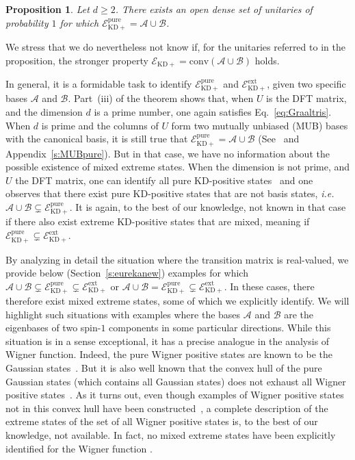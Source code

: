\documentclass[a4paper, notitlepage, 11pt]{article}
\numberwithin{equation}{section}
\newcommand{\Acal}{{\mathcal A}}
\newcommand{\Bcal}{{\mathcal B}}
\newcommand{\EcalKDC}{{\mathcal E}_{\mathrm{KD+}}}
\newcommand{\EcalKDCpu}{{\mathcal E}_{\mathrm{KD+}}^{\mathrm{pure}}}
\newcommand{\EcalKDCext}{{\mathcal E}_{\mathrm{KD+}}^{\mathrm{ext}}}
\newcommand{\conv}[1]{\mathrm{conv}\left(#1\right)}
\newcommand{\convAB}{\conv{\Acal \cup \Bcal}}
\newtheorem{Prop}[Theorem]{Proposition}
\begin{document}
\begin{Prop}\label{prop:pure_char} Let $d\geq2$.
There exists an open dense set of unitaries of probability $1$ for which $\EcalKDCpu=\Acal\cup\Bcal$.
\end{Prop} 
 We stress that we do nevertheless not know if, for the unitaries referred to in the proposition, the stronger property $\EcalKDC=\convAB$ holds.

In general, it is a formidable task to identify  $\EcalKDCpu$ and $\EcalKDCext$, given two specific bases $\Acal$ and $\Bcal$. Part~(iii) of the theorem shows that, when $U$ is the DFT matrix, and the dimension $d$ is a prime number, one again {satisfies} Eq.~\eqref{eq:Graaltris}. 
When $d$ is prime and { the columns of $U$ form two}  {mutually unbiased} (MUB) {bases with the canonical basis},  it is still true that $\EcalKDCpu=\Acal\cup\Bcal$ (See~\cite{Xu22} and Appendix~\ref{s:MUBpure}). But in that case, we have no information about the possible existence of mixed extreme states. 
When the dimension is not prime, and $U$ the DFT matrix, one can identify all pure KD-positive states~\cite{debievre2021,Xu22, debievre2023a} and one observes that there exist pure KD-positive states that are not basis states, \emph{i.e.} $\Acal\cup\Bcal\subsetneq \EcalKDCpu$. It is again, to the best of our knowledge, not known in that case if there also exist extreme KD-positive states that are mixed, meaning if $\EcalKDCpu\subsetneq \EcalKDCext$. 


By analyzing in detail the situation where the transition matrix is real-valued, we  provide below (Section~\ref{s:eurekanew}) examples for which $
\Acal\cup\Bcal \subsetneq \EcalKDCpu\subsetneq \EcalKDCext$ or $\Acal\cup\Bcal = \EcalKDCpu\subsetneq \EcalKDCext. $
In these cases, there therefore exist mixed extreme states, some of which we explicitly identify. {We will highlight such situations with examples  where the bases $\Acal$ and $\Bcal$ are the eigenbases of two spin-$1$ components in some particular directions. }  While this situation is in a sense exceptional, {it has a precise analogue in the analysis of Wigner function.} Indeed, the pure Wigner positive  states are known to be the Gaussian states~\cite{hudson1974}. But it is also well known that the convex hull of the pure Gaussian states (which contains all Gaussian states) does not exhaust all Wigner positive states~\cite{genonietal2013}. As it turns out, even though examples of Wigner positive states not in this convex hull have been constructed~\cite{genonietal2013, vanherstraetencerf2021, hertzdebievre2023}, a complete description of the extreme states of the set of all Wigner positive states is, to the best of our knowledge, not available. In fact, no mixed extreme states have been explicitly identified for the Wigner function \cite{gross2006}. 
\end{document}
